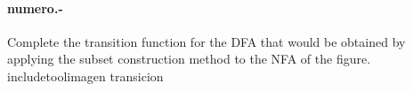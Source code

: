 

\paragraph{{numero}.-}\label{p{numero}}
Complete the transition function for the DFA that would be obtained by applying the subset construction method to the NFA of the figure.
    {includetool}{{imagen}}
{transicion}
